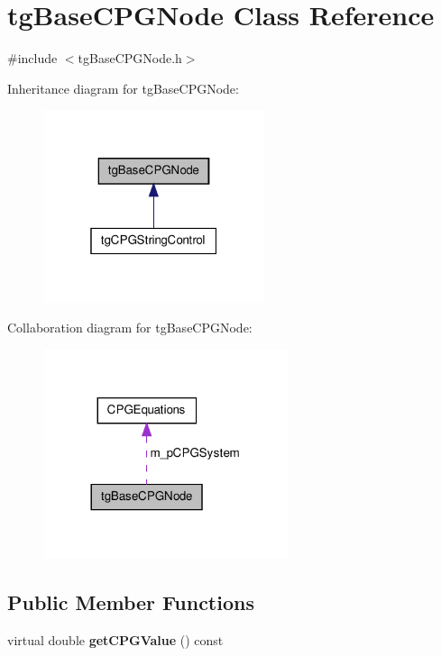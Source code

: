 \hypertarget{classtg_base_c_p_g_node}{\section{tg\-Base\-C\-P\-G\-Node Class Reference}
\label{classtg_base_c_p_g_node}
}


{\ttfamily \#include $<$tg\-Base\-C\-P\-G\-Node.\-h$>$}



Inheritance diagram for tg\-Base\-C\-P\-G\-Node\-:\nopagebreak
\begin{figure}[H]
\begin{center}
\leavevmode
\includegraphics[width=184pt]{classtg_base_c_p_g_node__inherit__graph}
\end{center}
\end{figure}


Collaboration diagram for tg\-Base\-C\-P\-G\-Node\-:\nopagebreak
\begin{figure}[H]
\begin{center}
\leavevmode
\includegraphics[width=204pt]{classtg_base_c_p_g_node__coll__graph}
\end{center}
\end{figure}
\subsection*{Public Member Functions}
\begin{DoxyCompactItemize}
\item 
\hypertarget{classtg_base_c_p_g_node_ad1d345d3ae51675eb18ae7de7e6338b4}{virtual double {\bfseries get\-C\-P\-G\-Value} () const }\label{classtg_base_c_p_g_node_ad1d345d3ae51675eb18ae7de7e6338b4}

\end{DoxyCompactItemize}
